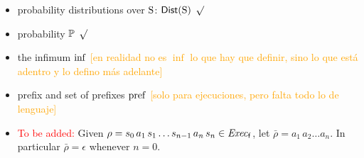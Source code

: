 \begin{itemize}
    \item probability distributions over $\S$: $\Dist(\S)$ \textcolor{green}{$\surd$}
    \item probability $\Prob$  \textcolor{green}{$\surd$}
    \item the infimum $\infim$  \textcolor{orange}{[en realidad no es $\inf$ lo que hay que definir, sino lo que est\'a adentro y lo defino m\'as adelante]}
    \item prefix and set of prefixes $\pref$ \textcolor{orange}{[solo para ejecuciones, pero falta todo lo de lenguaje]}
    \item \textcolor{red}{To be added:}
      Given $\rho = s_0\, a_1\, s_1\ldots s_{n-1}\, a_n\, s_n \in \execf$,
      let $\bar{\rho} = a_1\, a_2\ldots a_n$.
      In particular $\bar{\rho} = \epsilon$ whenever $n=0$.

\end{itemize}

